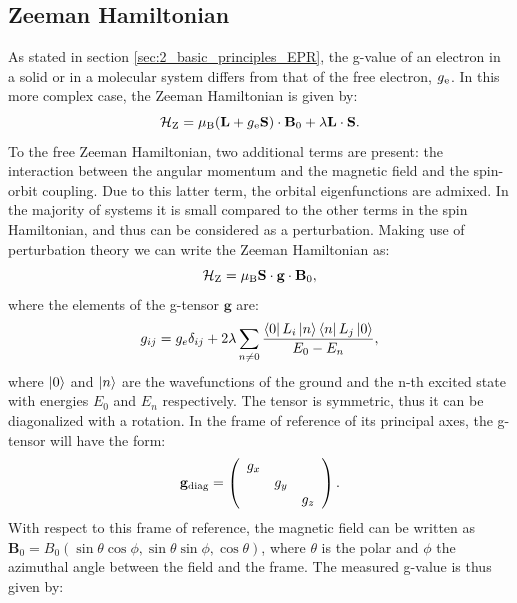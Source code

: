 \documentclass[a4paper]{book}
\newcommand{\tsub}{\textsubscript}
\newcommand{\mb}{\mathbf}
\begin{document}
	\subsection{Zeeman Hamiltonian}
	As stated in section \ref{sec:2_basic_principles_EPR}, the g-value of an electron in a solid or in a molecular system differs from that of the free electron, $g\tsub{e}$. In this more complex case, the Zeeman Hamiltonian is given by:
	\begin{equation}
		\mathcal{H}\tsub{Z} =
		\mu\tsub{B} ( \mb{L} + g\tsub{e}\mb{S}) \cdot \mb{B}_0 + \lambda \mb{L} \cdot \mb{S}.
		\label{eq:2_Hz_spinorbit}
	\end{equation}
	To the free Zeeman Hamiltonian, two additional terms are present: the interaction between the angular momentum and the magnetic field and the spin-orbit coupling. Due to this latter term, the orbital eigenfunctions are admixed. In the majority of systems it is small compared to the other terms in the spin Hamiltonian, and thus can be considered as a perturbation. Making use of perturbation theory we can write the Zeeman Hamiltonian as:
	\begin{equation}
		\mathcal{H}\tsub{Z} =
		\mu\tsub{B} \mb{S} \cdot \mb{g} \cdot \mb{B}_0,
		\label{eq:2_Hz_tensor}
	\end{equation} 
	where the elements of the g-tensor $\mb{g}$ are:
	\begin{equation}
		g_{ij} = g_e\delta_{ij} + 2\lambda\sum_{n \neq 0}\frac{\bra{0}L_i\ket{n}\bra{n}L_j\ket{0}}{E_0 - E_n},
		\label{eq:2_gij_perturbtheory}
	\end{equation}
	where $\ket{0}$ and $\ket{n}$ are the wavefunctions of the ground and the n-th excited state with energies $E_0$ and $E_n$ respectively. %
	The tensor is symmetric, thus it can be diagonalized with a rotation. In the frame of reference of its principal axes, the g-tensor will have the form:
	\begin{equation}
		\mb{g}\tsub{diag} = 
		\left(
		\begin{array}{ccc}
			g_x	&&\\
			&g_y&\\
			&&g_z\\
		\end{array}
		\right).
		\label{eq:2_gdiag}
	\end{equation}
	With respect to this frame of reference, the magnetic field can be written as $\mb{B}_0 = B_0(\sin\theta\cos\phi, \sin\theta\sin\phi, \cos\theta)$, where $\theta$ is the polar and $\phi$ the azimuthal angle between the field and the frame. The measured g-value is thus given by:
\end{document}
